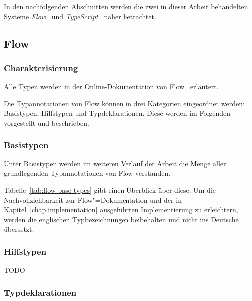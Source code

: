 In den nachfolgenden Abschnitten werden die zwei in dieser Arbeit behandelten Systeme \textit{Flow}~\autocite{FLOW:PAPER} und \textit{TypeScript}~\autocite{TYPESCRIPT:SPEC} näher betrachtet.

\subsection{Flow}
\label{subsec:flow}

\subsubsection{Charakterisierung}

Alle Typen werden in der Online-Dokumentation von Flow~\autocite{FLOW:TYPE_ANNOTATIONS} erläutert.

Die Typannotationen von Flow können in drei Kategorien eingeordnet werden: Basistypen, Hilfstypen und Typdeklarationen. Diese werden im Folgenden vorgestellt und beschrieben.

\subsubsection{Basistypen}
\label{subsec:flow:base-types}

Unter Basistypen werden im weiteren Verlauf der Arbeit die Menge aller grundlegenden Typannotationen von Flow verstanden.


Tabelle~\ref{tab:flow-base-types} gibt einen Überblick über diese. Um die Nachvollziehbarkeit zur Flow"=Dokumentation und der in Kapitel~\ref{chap:implementation} ausgeführten Implementierung zu erleichtern, werden die englischen Typbezeichnungen beibehalten und nicht ins Deutsche übersetzt.

\bigbreak


\subsubsection{Hilfstypen}
\label{subsec:flow:utility-types}

TODO

\bigbreak


\subsubsection{Typdeklarationen}
\label{subsubsec:type-declarations}

